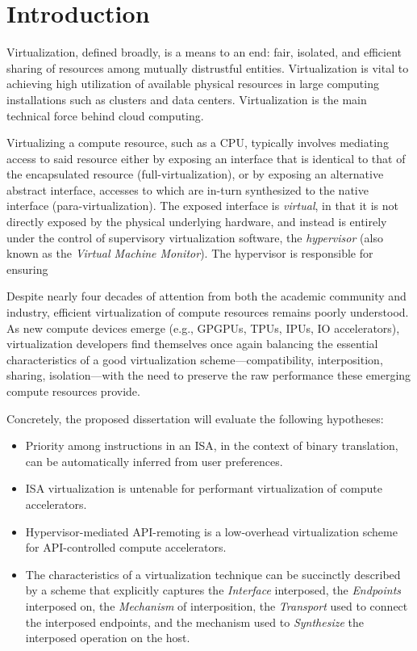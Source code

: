 \section{Introduction}
\label{sec:intro}

Virtualization, defined broadly, is a means to an end: fair, isolated, and
efficient sharing of resources among mutually distrustful entities.
Virtualization is vital to achieving high utilization of available physical
resources in large computing installations such as clusters and data centers.
Virtualization is the main technical force behind cloud computing.

Virtualizing a compute resource, such as a CPU, typically involves mediating
access to said resource either by exposing an interface that is identical to
that of the encapsulated resource (full-virtualization), or by
exposing an alternative abstract interface, accesses to which are in-turn
synthesized to the native interface (para-virtualization).
The exposed interface is \emph{virtual}, in that it is not directly exposed by
the physical underlying hardware, and instead is entirely under the control of
supervisory virtualization software, the \emph{hypervisor} (also known as the \emph{Virtual Machine Monitor}). The hypervisor is responsible for ensuring

Despite nearly four decades of attention from both the academic community and
industry, efficient virtualization of compute resources remains poorly
understood. As new compute devices emerge (e.g., GPGPUs, TPUs, IPUs, IO
accelerators), virtualization developers find themselves once again balancing
the essential characteristics of a good virtualization scheme---compatibility,
interposition, sharing, isolation---with the need to preserve the raw
performance these emerging compute resources provide.

\noindent Concretely, the proposed dissertation will evaluate the following
hypotheses:
\begin{itemize}[noitemsep,topsep=0pt,leftmargin=1em,labelwidth=*,align=left]
\item Priority among instructions in an ISA, in the context of binary
translation, can be automatically inferred from user preferences.
\item ISA virtualization is untenable for performant virtualization of compute
accelerators.
\item Hypervisor-mediated API-remoting is a low-overhead virtualization scheme
for API-controlled compute accelerators.
\item The characteristics of a virtualization technique can be succinctly
described by a scheme that explicitly captures the \textit{Interface}
interposed, the \textit{Endpoints} interposed on, the \textit{Mechanism} of
interposition, the \textit{Transport} used to connect the interposed
endpoints, and the mechanism used to \textit{Synthesize} the interposed
operation on the host.
\end{itemize}